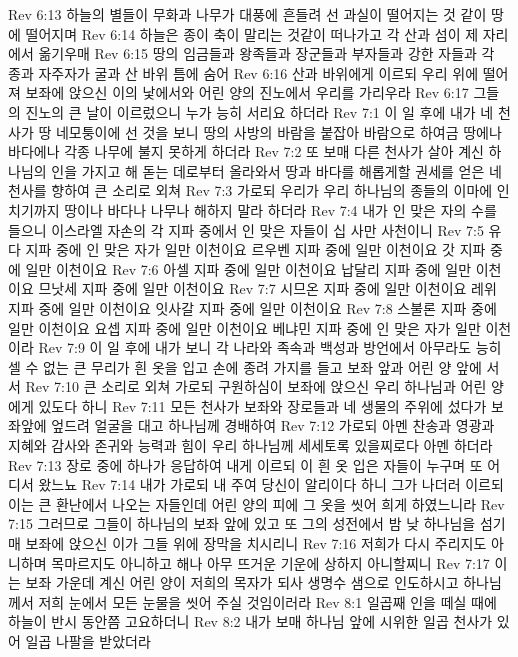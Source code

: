 Rev 6:13  하늘의 별들이 무화과 나무가 대풍에 흔들려 선 과실이 떨어지는 것 같이 땅에 떨어지며
Rev 6:14  하늘은 종이 축이 말리는 것같이 떠나가고 각 산과 섬이 제 자리에서 옮기우매
Rev 6:15  땅의 임금들과 왕족들과 장군들과 부자들과 강한 자들과 각 종과 자주자가 굴과 산 바위 틈에 숨어
Rev 6:16  산과 바위에게 이르되 우리 위에 떨어져 보좌에 앉으신 이의 낯에서와 어린 양의 진노에서 우리를 가리우라
Rev 6:17  그들의 진노의 큰 날이 이르렀으니 누가 능히 서리요 하더라
Rev 7:1  이 일 후에 내가 네 천사가 땅 네모퉁이에 선 것을 보니 땅의 사방의 바람을 붙잡아 바람으로 하여금 땅에나 바다에나 각종 나무에 불지 못하게 하더라
Rev 7:2  또 보매 다른 천사가 살아 계신 하나님의 인을 가지고 해 돋는 데로부터 올라와서 땅과 바다를 해롭게할 권세를 얻은 네 천사를 향하여 큰 소리로 외쳐
Rev 7:3  가로되 우리가 우리 하나님의 종들의 이마에 인치기까지 땅이나 바다나 나무나 해하지 말라 하더라
Rev 7:4  내가 인 맞은 자의 수를 들으니 이스라엘 자손의 각 지파 중에서 인 맞은 자들이 십 사만 사천이니
Rev 7:5  유다 지파 중에 인 맞은 자가 일만 이천이요 르우벤 지파 중에 일만 이천이요 갓 지파 중에 일만 이천이요
Rev 7:6  아셀 지파 중에 일만 이천이요 납달리 지파 중에 일만 이천이요 므낫세 지파 중에 일만 이천이요
Rev 7:7  시므온 지파 중에 일만 이천이요 레위 지파 중에 일만 이천이요 잇사갈 지파 중에 일만 이천이요
Rev 7:8  스불론 지파 중에 일만 이천이요 요셉 지파 중에 일만 이천이요 베냐민 지파 중에 인 맞은 자가 일만 이천이라
Rev 7:9  이 일 후에 내가 보니 각 나라와 족속과 백성과 방언에서 아무라도 능히 셀 수 없는 큰 무리가 흰 옷을 입고 손에 종려 가지를 들고 보좌 앞과 어린 양 앞에 서서
Rev 7:10  큰 소리로 외쳐 가로되 구원하심이 보좌에 앉으신 우리 하나님과 어린 양에게 있도다 하니
Rev 7:11  모든 천사가 보좌와 장로들과 네 생물의 주위에 섰다가 보좌앞에 엎드려 얼굴을 대고 하나님께 경배하여
Rev 7:12  가로되 아멘 찬송과 영광과 지혜와 감사와 존귀와 능력과 힘이 우리 하나님께 세세토록 있을찌로다 아멘 하더라
Rev 7:13  장로 중에 하나가 응답하여 내게 이르되 이 흰 옷 입은 자들이 누구며 또 어디서 왔느뇨
Rev 7:14  내가 가로되 내 주여 당신이 알리이다 하니 그가 나더러 이르되 이는 큰 환난에서 나오는 자들인데 어린 양의 피에 그 옷을 씻어 희게 하였느니라
Rev 7:15  그러므로 그들이 하나님의 보좌 앞에 있고 또 그의 성전에서 밤 낮 하나님을 섬기매 보좌에 앉으신 이가 그들 위에 장막을 치시리니
Rev 7:16  저희가 다시 주리지도 아니하며 목마르지도 아니하고 해나 아무 뜨거운 기운에 상하지 아니할찌니
Rev 7:17  이는 보좌 가운데 계신 어린 양이 저희의 목자가 되사 생명수 샘으로 인도하시고 하나님께서 저희 눈에서 모든 눈물을 씻어 주실 것임이러라
Rev 8:1  일곱째 인을 떼실 때에 하늘이 반시 동안쯤 고요하더니
Rev 8:2  내가 보매 하나님 앞에 시위한 일곱 천사가 있어 일곱 나팔을 받았더라
